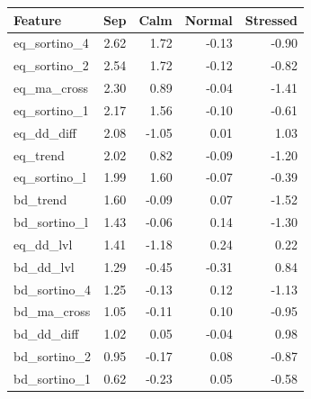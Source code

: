 \begin{tabular}{lrrrr}
\toprule
Feature & Sep & Calm & Normal & Stressed \\
\midrule
eq_sortino_4 & 2.62 & 1.72 & -0.13 & -0.90 \\
eq_sortino_2 & 2.54 & 1.72 & -0.12 & -0.82 \\
eq_ma_cross & 2.30 & 0.89 & -0.04 & -1.41 \\
eq_sortino_1 & 2.17 & 1.56 & -0.10 & -0.61 \\
eq_dd_diff & 2.08 & -1.05 & 0.01 & 1.03 \\
eq_trend & 2.02 & 0.82 & -0.09 & -1.20 \\
eq_sortino_l & 1.99 & 1.60 & -0.07 & -0.39 \\
bd_trend & 1.60 & -0.09 & 0.07 & -1.52 \\
bd_sortino_l & 1.43 & -0.06 & 0.14 & -1.30 \\
eq_dd_lvl & 1.41 & -1.18 & 0.24 & 0.22 \\
bd_dd_lvl & 1.29 & -0.45 & -0.31 & 0.84 \\
bd_sortino_4 & 1.25 & -0.13 & 0.12 & -1.13 \\
bd_ma_cross & 1.05 & -0.11 & 0.10 & -0.95 \\
bd_dd_diff & 1.02 & 0.05 & -0.04 & 0.98 \\
bd_sortino_2 & 0.95 & -0.17 & 0.08 & -0.87 \\
bd_sortino_1 & 0.62 & -0.23 & 0.05 & -0.58 \\
\bottomrule
\end{tabular}
